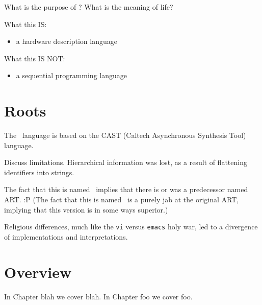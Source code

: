 What is the purpose of \artxx?
What is the meaning of life?

What this IS:
\begin{itemize}
\item a hardware description language
\end{itemize}

What this IS NOT:
\begin{itemize}
\item a sequential programming language
\end{itemize}

\section{Roots}
\label{sec:intro:roots}

The \artxx\ language is based on the CAST
(Caltech Asynchronous Synthesis Tool) language.  

Discuss limitations.  
Hierarchical information was lost, as a result of 
flattening identifiers into strings.  

The fact that this is named \artxx\ implies that there is or was a 
predecessor named ART.  :P
(The fact that this is named \artxx\ is a purely jab at the original ART, 
implying that this version is in some ways superior.)

Religious differences, much like the
\verb|vi| versus \verb|emacs| holy war, 
led to a divergence of implementations and interpretations.  


\section{Overview}
\label{sec:intro:overview}

In Chapter blah we cover blah.  
In Chapter foo we cover foo.  


